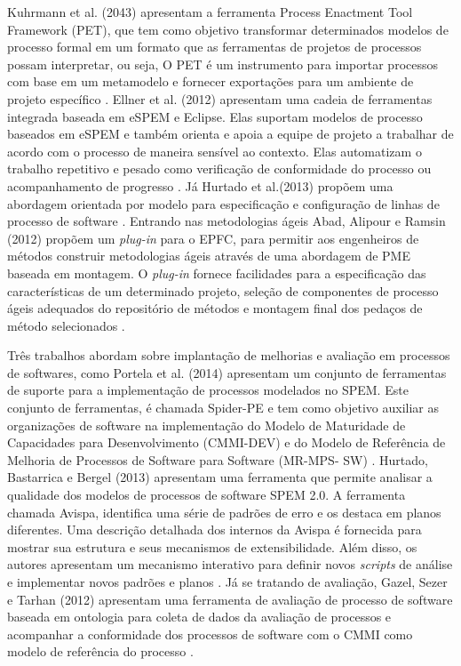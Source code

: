  Kuhrmann et al. (2043) apresentam a ferramenta Process Enactment Tool Framework (PET), que tem como objetivo transformar determinados modelos de processo formal em um formato que as ferramentas de projetos de processos possam interpretar, ou seja,  O PET é um instrumento para importar processos com base em um metamodelo e fornecer exportações para um ambiente de projeto específico \cite{1kuhrmann:2014}. Ellner et al. (2012) apresentam uma cadeia de ferramentas integrada baseada em eSPEM e Eclipse. Elas suportam modelos de processo baseados em eSPEM e também orienta e apoia a equipe de projeto a trabalhar de acordo com o processo de maneira sensível ao contexto. Elas automatizam o trabalho repetitivo e pesado como verificação de conformidade do processo ou acompanhamento de progresso \cite{10ellner:2012}. Já Hurtado et al.(2013) propõem uma abordagem orientada por modelo para especificação e configuração de linhas de processo de software \cite{8hurtado:2013}. Entrando nas metodologias ágeis Abad, Alipour e Ramsin (2012)  propõem um \textit{plug-in} para o EPFC, para permitir aos engenheiros de métodos construir metodologias ágeis através de uma abordagem de PME baseada em montagem. O \textit{plug-in} fornece facilidades para a especificação das características de um determinado projeto, seleção de componentes de processo ágeis adequados do repositório de métodos e montagem final dos pedaços de método selecionados \cite{13abad:2012}.
 
 
Três trabalhos abordam sobre implantação de melhorias e avaliação em processos de softwares, como Portela et al. (2014) apresentam um conjunto de ferramentas de suporte para a implementação de processos modelados no SPEM. Este conjunto de ferramentas, é chamada Spider-PE e tem como objetivo auxiliar as organizações de software na implementação do Modelo de Maturidade de Capacidades para Desenvolvimento (CMMI-DEV) e do Modelo de Referência de Melhoria de Processos de Software para Software (MR-MPS- SW) \cite{9portela:2014}. Hurtado, Bastarrica e Bergel (2013) apresentam uma ferramenta que permite analisar a qualidade dos modelos de processos de software SPEM 2.0. A ferramenta chamada Avispa, identifica uma série de padrões de erro e os destaca em planos diferentes. Uma descrição detalhada dos internos da Avispa é fornecida para mostrar sua estrutura e seus mecanismos de extensibilidade. Além disso, os autores apresentam um mecanismo interativo para definir novos \textit{scripts} de análise e implementar novos padrões e planos \cite{6hurtado:2013}. 
Já se tratando de avaliação, Gazel, Sezer e Tarhan (2012) apresentam uma ferramenta de avaliação de processo de software baseada em ontologia para coleta de dados da avaliação de processos e acompanhar a conformidade dos processos de software com o CMMI como modelo de referência do processo \cite{7gazel:2012}. 



